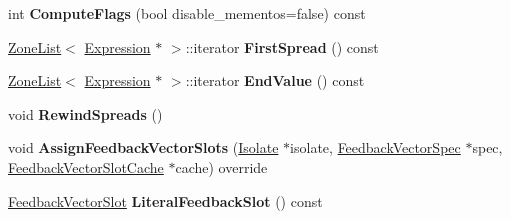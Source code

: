 \begin{DoxyCompactItemize}
\item 
int {\bfseries Compute\+Flags} (bool disable\+\_\+mementos=false) const \hypertarget{classv8_1_1internal_1_1_array_literal_a2c6b7d89f636f9922c93034844decfb0}{}\label{classv8_1_1internal_1_1_array_literal_a2c6b7d89f636f9922c93034844decfb0}

\item 
\hyperlink{classv8_1_1internal_1_1_zone_list}{Zone\+List}$<$ \hyperlink{classv8_1_1internal_1_1_expression}{Expression} $\ast$ $>$\+::iterator {\bfseries First\+Spread} () const \hypertarget{classv8_1_1internal_1_1_array_literal_a320dfa8128e8951b00b7d963072c938d}{}\label{classv8_1_1internal_1_1_array_literal_a320dfa8128e8951b00b7d963072c938d}

\item 
\hyperlink{classv8_1_1internal_1_1_zone_list}{Zone\+List}$<$ \hyperlink{classv8_1_1internal_1_1_expression}{Expression} $\ast$ $>$\+::iterator {\bfseries End\+Value} () const \hypertarget{classv8_1_1internal_1_1_array_literal_a45df219b1eb64aad5ce0f6c9451d0f71}{}\label{classv8_1_1internal_1_1_array_literal_a45df219b1eb64aad5ce0f6c9451d0f71}

\item 
void {\bfseries Rewind\+Spreads} ()\hypertarget{classv8_1_1internal_1_1_array_literal_a15e6066d7fd1258ecd9d334cecc67087}{}\label{classv8_1_1internal_1_1_array_literal_a15e6066d7fd1258ecd9d334cecc67087}

\item 
void {\bfseries Assign\+Feedback\+Vector\+Slots} (\hyperlink{classv8_1_1internal_1_1_isolate}{Isolate} $\ast$isolate, \hyperlink{classv8_1_1internal_1_1_feedback_vector_spec}{Feedback\+Vector\+Spec} $\ast$spec, \hyperlink{classv8_1_1internal_1_1_feedback_vector_slot_cache}{Feedback\+Vector\+Slot\+Cache} $\ast$cache) override\hypertarget{classv8_1_1internal_1_1_array_literal_ada3eb0a30e2334b845a9fa02a900b99b}{}\label{classv8_1_1internal_1_1_array_literal_ada3eb0a30e2334b845a9fa02a900b99b}

\item 
\hyperlink{classv8_1_1internal_1_1_feedback_vector_slot}{Feedback\+Vector\+Slot} {\bfseries Literal\+Feedback\+Slot} () const \hypertarget{classv8_1_1internal_1_1_array_literal_ad12a5c2a27ee41ff8fa7a44321fba6dd}{}\label{classv8_1_1internal_1_1_array_literal_ad12a5c2a27ee41ff8fa7a44321fba6dd}

\end{DoxyCompactItemize}

